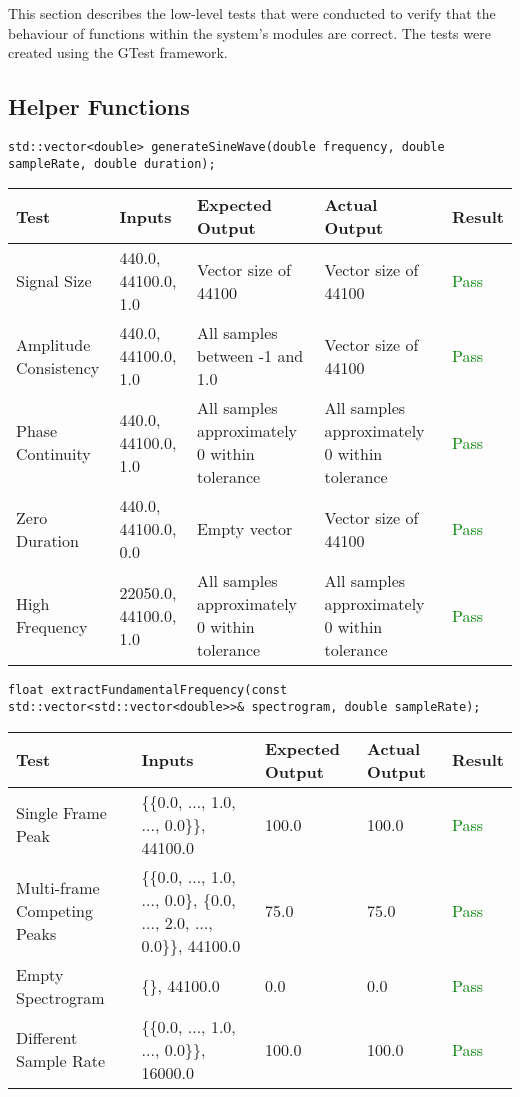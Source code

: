 \documentclass[12pt, titlepage]{article}
\begin{document}
This section describes the low-level tests that were conducted to verify that the behaviour of 
functions within the system's modules are correct. The tests were created using the GTest framework.

\subsection{Helper Functions}

\texttt{std::vector<double> generateSineWave(double frequency, double sampleRate, double duration);}
\begin{longtable}{|L{3cm}|L{2cm}|L{2cm}|L{2cm}|l|}
  \hline
  \textbf{Test} & \textbf{Inputs} & \textbf{Expected Output} & \textbf{Actual Output} & \textbf{Result} \\
  \hline
  Signal Size & 440.0, 44100.0, 1.0 & Vector size of 44100 & Vector size of 44100 & \textcolor{green}{Pass} \\
  \hline
  Amplitude Consistency & 440.0, 44100.0, 1.0 & All samples between -1 and 1.0 & Vector size of 44100 & \textcolor{green}{Pass} \\
  \hline
  Phase Continuity & 440.0, 44100.0, 1.0 & All samples approximately 0 within tolerance & All samples approximately 0 within tolerance & \textcolor{green}{Pass} \\
  \hline
  Zero Duration & 440.0, 44100.0, 0.0 & Empty vector & Vector size of 44100 & \textcolor{green}{Pass} \\
  \hline
  High Frequency & 22050.0, 44100.0, 1.0 & All samples approximately 0 within tolerance & All samples approximately 0 within tolerance & \textcolor{green}{Pass} \\
  \hline
\end{longtable}


\noindent\texttt{float extractFundamentalFrequency(const std::vector<std::vector<double>>\& spectrogram, double sampleRate);}

\begin{longtable}{|L{3cm}|L{2cm}|L{2cm}|L{2cm}|l|}
  \hline
  \textbf{Test} & \textbf{Inputs} & \textbf{Expected Output} & \textbf{Actual Output} & \textbf{Result} \\
  \hline
  Single Frame Peak & \{\{0.0, ..., 1.0, ..., 0.0\}\}, 44100.0 & 100.0 & 100.0 & \textcolor{green}{Pass} \\
  \hline
  Multi-frame Competing Peaks & \{\{0.0, ..., 1.0, ..., 0.0\}, \{0.0, ..., 2.0, ..., 0.0\}\}, 44100.0 & 75.0 & 75.0 & \textcolor{green}{Pass} \\
  \hline
  Empty Spectrogram & \{\}, 44100.0 & 0.0 & 0.0 & \textcolor{green}{Pass} \\
  \hline
  Different Sample Rate & \{\{0.0, ..., 1.0, ..., 0.0\}\}, 16000.0 & 100.0 & 100.0 & \textcolor{green}{Pass} \\
  \hline
\end{longtable}
\end{document}
